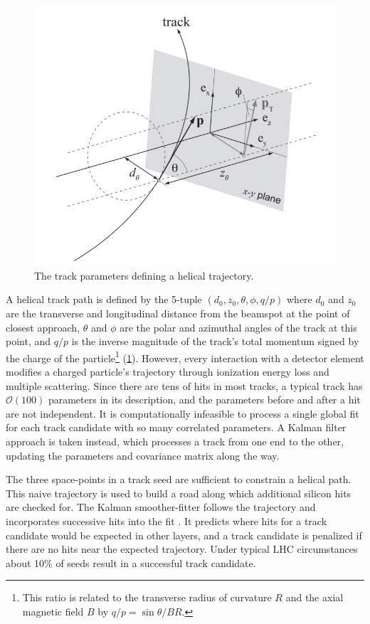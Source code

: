 \begin{figure}[t]
  \includegraphics{track_schematic.png}
  \caption{The track parameters defining a helical trajectory.}
  \label{fig:trk_params}
\end{figure}

A helical track path is defined by the 5-tuple
\( \left( d_0, z_0, \theta, \phi, q/p \right) \)
where $d_0$ and $z_0$ are the transverse and longitudinal distance from the beamspot at the point of closest approach, $\theta$ and $\phi$ are the polar and azimuthal angles of the track at this point, and $q/p$ is the inverse magnitude of the track's total momentum signed by the charge of the particle\footnote{This ratio is related to the transverse radius of curvature $R$ and the axial magnetic field $B$ by $q/p = \sin \theta / B R$.} (\cref{fig:trk_params}).
However, every interaction with a detector element modifies a charged particle's trajectory through ionization energy loss and multiple scattering.
Since there are tens of hits in most tracks, a typical track has $\mathcal{O}(100)$ parameters in its description, and the parameters before and after a hit are not independent.
It is computationally infeasible to process a single global fit for each track candidate with so many correlated parameters.
A Kalman filter approach is taken instead, which processes a track from one end to the other, updating the parameters and covariance matrix along the way.

The three space-points in a track seed are sufficient to constrain a helical path.
This naive trajectory is used to build a road along which additional silicon hits are checked for.
The Kalman smoother-fitter follows the trajectory and incorporates successive hits into the fit \cite{Cornelissen:2008zza}. %
It predicts where hits for a track candidate would be expected in other layers, and a track candidate is penalized if there are no hits near the expected trajectory. %
Under typical LHC circumstances about 10\% of seeds result in a successful track candidate.

